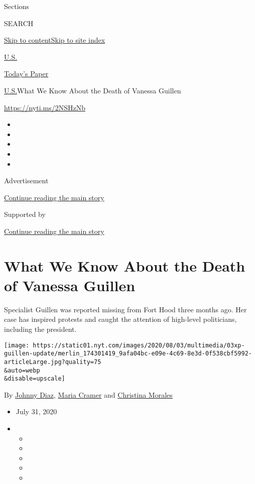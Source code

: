 Sections

SEARCH

\protect\hyperlink{site-content}{Skip to
content}\protect\hyperlink{site-index}{Skip to site index}

\href{https://www.nytimes.com/section/us}{U.S.}

\href{https://myaccount.nytimes.com/auth/login?response_type=cookie\&client_id=vi}{}

\href{https://www.nytimes.com/section/todayspaper}{Today's Paper}

\href{/section/us}{U.S.}\textbar{}What We Know About the Death of
Vanessa Guillen

\url{https://nyti.ms/2NSHzNb}

\begin{itemize}
\item
\item
\item
\item
\item
\end{itemize}

Advertisement

\protect\hyperlink{after-top}{Continue reading the main story}

Supported by

\protect\hyperlink{after-sponsor}{Continue reading the main story}

\hypertarget{what-we-know-about-the-death-of-vanessa-guillen}{%
\section{What We Know About the Death of Vanessa
Guillen}\label{what-we-know-about-the-death-of-vanessa-guillen}}

Specialist Guillen was reported missing from Fort Hood three months ago.
Her case has inspired protests and caught the attention of high-level
politicians, including the president.

\texttt{[image: https://static01.nyt.com/images/2020/08/03/multimedia/03xp-guillen-update/merlin\_174301419\_9afa04bc-e09e-4c69-8e3d-0f538cbf5992-articleLarge.jpg?quality=75\\\&auto=webp\\\&disable=upscale]}

By \href{https://www.nytimes.com/by/johnny-diaz}{Johnny Diaz},
\href{https://www.nytimes.com/by/maria-cramer}{Maria Cramer} and
\href{https://www.nytimes.com/by/christina-morales}{Christina Morales}

\begin{itemize}
\item
  July 31, 2020
\item
  \begin{itemize}
  \item
  \item
  \item
  \item
  \item
  \end{itemize}
\end{itemize}

